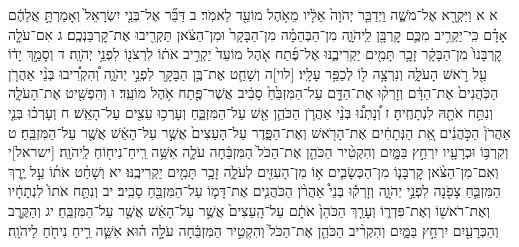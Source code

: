 \documentclass[twoside, openany, parskip=half, 11pt]{book}
\begin{document}
א א וַיִּקְרָ֖א אֶל־מֹשֶׁ֑ה וַיְדַבֵּ֤ר יְהֹוָה֙ אֵלָ֔יו מֵאֹ֥הֶל מוֹעֵ֖ד לֵאמֹֽר׃ ב דַּבֵּ֞ר אֶל־בְּנֵ֤י יִשְׂרָאֵל֙ וְאָמַרְתָּ֣ אֲלֵהֶ֔ם אָדָ֗ם כִּֽי־יַקְרִ֥יב מִכֶּ֛ם קׇרְבָּ֖ן לַֽיהֹוָ֑ה מִן־הַבְּהֵמָ֗ה מִן־הַבָּקָר֙ וּמִן־הַצֹּ֔אן תַּקְרִ֖יבוּ אֶת־קׇרְבַּנְכֶֽם׃ ג אִם־עֹלָ֤ה קׇרְבָּנוֹ֙ מִן־הַבָּקָ֔ר זָכָ֥ר תָּמִ֖ים יַקְרִיבֶ֑נּוּ אֶל־פֶּ֜תַח אֹ֤הֶל מוֹעֵד֙ יַקְרִ֣יב אֹת֔וֹ לִרְצֹנ֖וֹ לִפְנֵ֥י יְהֹוָֽה׃ ד וְסָמַ֣ךְ יָד֔וֹ עַ֖ל רֹ֣אשׁ הָעֹלָ֑ה וְנִרְצָ֥ה ל֖וֹ לְכַפֵּ֥ר עָלָֽיו׃ [לוי]ה וְשָׁחַ֛ט אֶת־בֶּ֥ן הַבָּקָ֖ר לִפְנֵ֣י יְהֹוָ֑ה וְ֠הִקְרִ֠יבוּ בְּנֵ֨י אַהֲרֹ֤ן הַכֹּֽהֲנִים֙ אֶת־הַדָּ֔ם וְזָרְק֨וּ אֶת־הַדָּ֤ם עַל־הַמִּזְבֵּ֙חַ֙ סָבִ֔יב אֲשֶׁר־פֶּ֖תַח אֹ֥הֶל מוֹעֵֽד׃ ו וְהִפְשִׁ֖יט אֶת־הָעֹלָ֑ה וְנִתַּ֥ח אֹתָ֖הּ לִנְתָחֶֽיהָ׃ ז וְ֠נָתְנ֠וּ בְּנֵ֨י אַהֲרֹ֧ן הַכֹּהֵ֛ן אֵ֖שׁ עַל־הַמִּזְבֵּ֑חַ וְעָרְכ֥וּ עֵצִ֖ים עַל־הָאֵֽשׁ׃ ח וְעָרְכ֗וּ בְּנֵ֤י אַהֲרֹן֙ הַכֹּ֣הֲנִ֔ים אֵ֚ת הַנְּתָחִ֔ים אֶת־הָרֹ֖אשׁ וְאֶת־הַפָּ֑דֶר עַל־הָעֵצִים֙ אֲשֶׁ֣ר עַל־הָאֵ֔שׁ אֲשֶׁ֖ר עַל־הַמִּזְבֵּֽחַ׃ ט וְקִרְבּ֥וֹ וּכְרָעָ֖יו יִרְחַ֣ץ בַּמָּ֑יִם וְהִקְטִ֨יר הַכֹּהֵ֤ן אֶת־הַכֹּל֙ הַמִּזְבֵּ֔חָה עֹלָ֛ה אִשֵּׁ֥ה רֵֽיחַ־נִיח֖וֹחַ לַֽיהֹוָֽה׃
[ישראל]י וְאִם־מִן־הַצֹּ֨אן קׇרְבָּנ֧וֹ מִן־הַכְּשָׂבִ֛ים א֥וֹ מִן־הָעִזִּ֖ים לְעֹלָ֑ה זָכָ֥ר תָּמִ֖ים יַקְרִיבֶֽנּוּ׃ יא וְשָׁחַ֨ט אֹת֜וֹ עַ֣ל יֶ֧רֶךְ הַמִּזְבֵּ֛חַ צָפֹ֖נָה לִפְנֵ֣י יְהֹוָ֑ה וְזָרְק֡וּ בְּנֵי֩ אַהֲרֹ֨ן הַכֹּהֲנִ֧ים אֶת־דָּמ֛וֹ עַל־הַמִּזְבֵּ֖חַ סָבִֽיב׃ יב וְנִתַּ֤ח אֹתוֹ֙ לִנְתָחָ֔יו וְאֶת־רֹאשׁ֖וֹ וְאֶת־פִּדְר֑וֹ וְעָרַ֤ךְ הַכֹּהֵן֙ אֹתָ֔ם עַל־הָֽעֵצִים֙ אֲשֶׁ֣ר עַל־הָאֵ֔שׁ אֲשֶׁ֖ר עַל־הַמִּזְבֵּֽחַ׃ יג וְהַקֶּ֥רֶב וְהַכְּרָעַ֖יִם יִרְחַ֣ץ בַּמָּ֑יִם וְהִקְרִ֨יב הַכֹּהֵ֤ן אֶת־הַכֹּל֙ וְהִקְטִ֣יר הַמִּזְבֵּ֔חָה עֹלָ֣ה ה֗וּא אִשֵּׁ֛ה רֵ֥יחַ נִיחֹ֖חַ לַיהֹוָֽה׃
\end{document}
